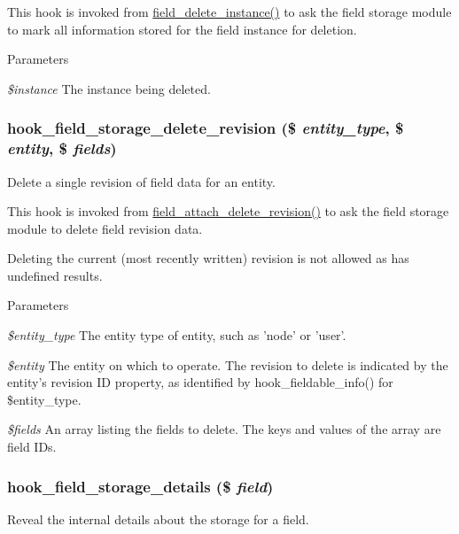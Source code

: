 This hook is invoked from \hyperlink{group__field__crud_ga16bf0e2a15b20b066ff84403b5f24bf5}{field\_\-delete\_\-instance()} to ask the field storage module to mark all information stored for the field instance for deletion.


\begin{DoxyParams}{Parameters}
\item[{\em \$instance}]The instance being deleted. \end{DoxyParams}
\hypertarget{group__field__storage_ga74ff0893fd8d05ab372bd4b65d0ffc71}{
\subsubsection[{hook\_\-field\_\-storage\_\-delete\_\-revision}]{\setlength{\rightskip}{0pt plus 5cm}hook\_\-field\_\-storage\_\-delete\_\-revision (\$ {\em entity\_\-type}, \/  \$ {\em entity}, \/  \$ {\em fields})}}
\label{group__field__storage_ga74ff0893fd8d05ab372bd4b65d0ffc71}
Delete a single revision of field data for an entity.

This hook is invoked from \hyperlink{group__field__attach_gaa9eae65e6d9f1996cb27a55ba25b56e9}{field\_\-attach\_\-delete\_\-revision()} to ask the field storage module to delete field revision data.

Deleting the current (most recently written) revision is not allowed as has undefined results.


\begin{DoxyParams}{Parameters}
\item[{\em \$entity\_\-type}]The entity type of entity, such as 'node' or 'user'. \item[{\em \$entity}]The entity on which to operate. The revision to delete is indicated by the entity's revision ID property, as identified by hook\_\-fieldable\_\-info() for \$entity\_\-type. \item[{\em \$fields}]An array listing the fields to delete. The keys and values of the array are field IDs. \end{DoxyParams}
\hypertarget{group__field__storage_ga72b4d22502ffc709e50de0ba4f417062}{
\subsubsection[{hook\_\-field\_\-storage\_\-details}]{\setlength{\rightskip}{0pt plus 5cm}hook\_\-field\_\-storage\_\-details (\$ {\em field})}}
\label{group__field__storage_ga72b4d22502ffc709e50de0ba4f417062}
Reveal the internal details about the storage for a field.

